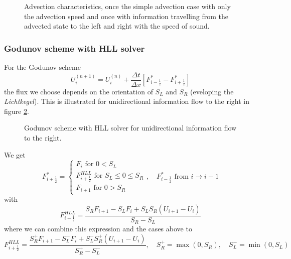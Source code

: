 \begin{figure}[htb!]
    \centering
    
    \caption{Advection characteristics, once the simple advection case with only the advection speed and once with information travelling from the advected state to the left and right with the speed of sound.}
    \label{fig:adv_char}
\end{figure}

\subsubsection{Godunov scheme with HLL solver}
For the Godunov scheme
\begin{equation}
    U_i^{(n+1)} = U_i^{(n)} + \frac{\Delta t}{\Delta x} \left[ F^*_{i-\frac{1}{2}} - F^*_{i+\frac{1}{2}} \right]
\end{equation}
the flux we choose depends on the orientation of $S_L$ and $S_R$ (eveloping the \textit{Lichtkegel}).
This is illustrated for unidirectional information flow to the right in figure \ref{fig:godunov_unidir}.

\begin{figure}[htb!]
    \centering
    
    \caption{Godunov scheme with HLL solver for unidirectional information flow to the right.}
    \label{fig:godunov_unidir}
\end{figure}

We get
\begin{equation}
    F_{i+\frac{1}{2}}^*=\left\{\begin{array}{c}
        F_i \text { for } 0<S_L \\
        F_{i+\frac{1}{2}}^{H L L} \text { for } S_L \leq 0 \leq S_R\\
        F_{i+1} \text { for } 0>S_R
        \end{array}\right., \quad F_{i-\frac{1}{2}}^* \text { from } i \rightarrow i-1 
\end{equation}
with
\begin{equation}
    F_{i+\frac{1}{2}}^{H L L}=\frac{S_R F_{i+1}-S_L F_i+S_L S_R\left(U_{i+1}-U_i\right)}{S_R-S_L}
\end{equation}
where we can combine this expression and the cases above to
\begin{equation}
    F_{i+\frac{1}{2}}^{H L L}=\frac{S_R^+ F_{i+1}-S_L^- F_i+S_L^- S_R^+\left(U_{i+1}-U_i\right)}{S_R^+-S_L^-}, \quad S_R^+ = \max(0, S_R), \quad S_L^- = \min(0, S_L)
\end{equation}

